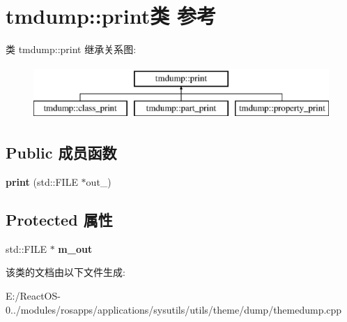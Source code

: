 \hypertarget{classtmdump_1_1print}{}\section{tmdump\+:\+:print类 参考}
\label{classtmdump_1_1print}
类 tmdump\+:\+:print 继承关系图\+:\begin{figure}[H]
\begin{center}
\leavevmode
\includegraphics[height=2.000000cm]{classtmdump_1_1print}
\end{center}
\end{figure}
\subsection*{Public 成员函数}
\begin{DoxyCompactItemize}
\item 
\mbox{\label{classtmdump_1_1print_a7fbd87b292dc1b63abee844ed3fe42d5}} 
{\bfseries print} (std\+::\+F\+I\+LE $\ast$out\+\_\+)
\end{DoxyCompactItemize}
\subsection*{Protected 属性}
\begin{DoxyCompactItemize}
\item 
\mbox{\label{classtmdump_1_1print_a12c4d36a563265f83ffa589f7bcc01ee}} 
std\+::\+F\+I\+LE $\ast$ {\bfseries m\+\_\+out}
\end{DoxyCompactItemize}


该类的文档由以下文件生成\+:\begin{DoxyCompactItemize}
\item 
E\+:/\+React\+O\+S-\/0../modules/rosapps/applications/sysutils/utils/theme/dump/themedump.\+cpp\end{DoxyCompactItemize}
